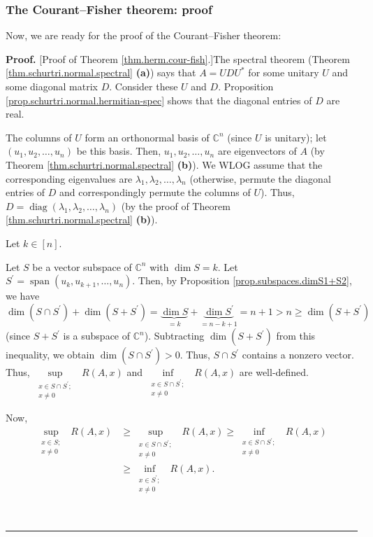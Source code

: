 \documentclass[numbers=enddot,12pt,final,onecolumn,notitlepage]{scrartcl}%
\numberwithin{exer}{subsection}
\theoremstyle{definition}
\newenvironment{proof}[1][Proof]{\noindent\textbf{#1.} }{\ \rule{0.5em}{0.5em}}
\begin{document}
\subsubsection{The Courant--Fisher theorem: proof}

Now, we are ready for the proof of the Courant--Fisher theorem:

\begin{proof}
[Proof of Theorem \ref{thm.herm.cour-fish}.]The spectral theorem (Theorem
\ref{thm.schurtri.normal.spectral} \textbf{(a)}) says that $A=UDU^{\ast}$ for
some unitary $U$ and some diagonal matrix $D$. Consider these $U$ and $D$.
Proposition \ref{prop.schurtri.normal.hermitian-spec} shows that the diagonal
entries of $D$ are real.

The columns of $U$ form an orthonormal basis of $\mathbb{C}^{n}$ (since $U$ is
unitary); let $\left(  u_{1},u_{2},\ldots,u_{n}\right)  $ be this basis. Then,
$u_{1},u_{2},\ldots,u_{n}$ are eigenvectors of $A$ (by Theorem
\ref{thm.schurtri.normal.spectral} \textbf{(b)}). We WLOG assume that the
corresponding eigenvalues are $\lambda_{1},\lambda_{2},\ldots,\lambda_{n}$
(otherwise, permute the diagonal entries of $D$ and correspondingly permute
the columns of $U$). Thus, $D=\operatorname*{diag}\left(  \lambda_{1}%
,\lambda_{2},\ldots,\lambda_{n}\right)  $ (by the proof of Theorem
\ref{thm.schurtri.normal.spectral} \textbf{(b)}).

Let $k\in\left[  n\right]  $.

Let $S$ be a vector subspace of $\mathbb{C}^{n}$ with $\dim S=k$. Let
$S^{\prime}=\operatorname*{span}\left(  u_{k},u_{k+1},\ldots,u_{n}\right)  $.
Then, by Proposition \ref{prop.subspaces.dimS1+S2}, we have%
\[
\dim\left(  S\cap S^{\prime}\right)  +\dim\left(  S+S^{\prime}\right)
=\underbrace{\dim S}_{=k}+\underbrace{\dim S^{\prime}}_{=n-k+1}=n+1>n\geq
\dim\left(  S+S^{\prime}\right)
\]
(since $S+S^{\prime}$ is a subspace of $\mathbb{C}^{n}$). Subtracting
$\dim\left(  S+S^{\prime}\right)  $ from this inequality, we obtain
$\dim\left(  S\cap S^{\prime}\right)  >0$. Thus, $S\cap S^{\prime}$ contains a
nonzero vector. Thus, $\sup\limits_{\substack{x\in S\cap S^{\prime};\\x\neq
0}}\ \ R\left(  A,x\right)  $ and $\inf\limits_{\substack{x\in S\cap
S^{\prime};\\x\neq0}}\ \ R\left(  A,x\right)  $ are well-defined.

Now,%
\begin{align}
\sup\limits_{\substack{x\in S;\\x\neq0}}\ \ R\left(  A,x\right)   &  \geq
\sup\limits_{\substack{x\in S\cap S^{\prime};\\x\neq0}}\ \ R\left(
A,x\right)  \geq\inf\limits_{\substack{x\in S\cap S^{\prime};\\x\neq
0}}\ \ R\left(  A,x\right) \nonumber\\
&  \geq\inf\limits_{\substack{x\in S^{\prime};\\x\neq0}}\ \ R\left(
A,x\right)  . \label{pf.thm.herm.cour-fish.4}%
\end{align}



\end{proof}
\end{document}
